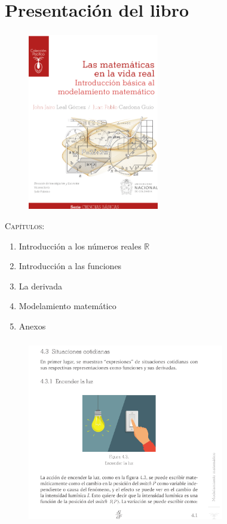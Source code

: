 \section{Presentación del libro}

\begin{frame}
	\frametitle{\secname}%
	\begin{minipage}{0.47\textwidth}
		\begin{figure}[ht!]
			\centering
			\includegraphics[height=7.7cm]{portada}
		\end{figure}
	\end{minipage}%
	\begin{minipage}{0.5\textwidth}
		\textsc{\large Capítulos:}
		\begin{enumerate}
			\item Introducción a los números reales $\mathbb{R}$
			\item Introducción a las funciones
			\item La derivada
			\item Modelamiento matemático
			\item Anexos
		\end{enumerate}
	\end{minipage}

\end{frame}

\begin{frame}
	\frametitle{\secname}
	\begin{figure}[ht!]
		\centering
		\includegraphics[height=7.7cm]{vida_cotidiana}
	\end{figure}
\end{frame}

